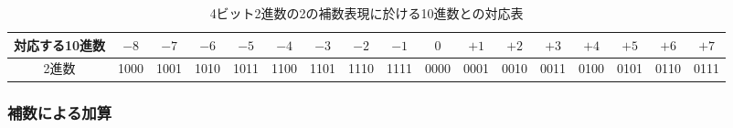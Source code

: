 \begin{table}[H]
	\caption{4ビット2進数の2の補数表現に於ける10進数との対応表}
	\label{tab27-4}
	\centering
	\begin{tabular}{c|cccccccccccccccc}
		\hline
		\textsf{対応する10進数} &
		$-8$ & $-7$ & $-6$ & $-5$ &
		$-4$ & $-3$ & $-2$ & $-1$ &
		$ 0$ & $+1$ & $+2$ & $+3$ &
		$+4$ & $+5$ & $+6$ & $+7$ \\
		\hline
		\textsf{2進数} &
		1000 & 1001 & 1010 & 1011 &
		1100 & 1101 & 1110 & 1111 &
		0000 & 0001 & 0010 & 0011 &
		0100 & 0101 & 0110 & 0111 \\
		\hline
	\end{tabular}
\end{table}



\subsubsection{補数による加算}

